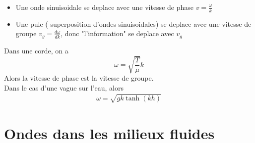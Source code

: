 \documentclass[../main.tex]{subfiles}
\begin{document}
\begin{itemize}
\item Une onde sinuisoidale se deplace avec une vitesse de phase $v= \frac{\omega }{k}$ 
\item Une pule ( superposition d'ondes sinuisoidales) se deplace avec une vitesse de groupe $v_g = \frac{d \omega }{d k}$, donc "l'information" se deplace avec $v_g$
\end{itemize}
\begin{exemple}
Dans une corde, on a 
\[ 
\omega = \sqrt{ \frac{T}{\mu}}  k
\]
Alors la vitesse de phase est la vitesse de groupe.\\
Dans le cas d'une vague sur l'eau, alors
\begin{align*}
	\omega  = \sqrt{gk \tanh ( kh) } 
\end{align*}

\section{Ondes dans les milieux fluides}

\end{exemple}
\end{document}
